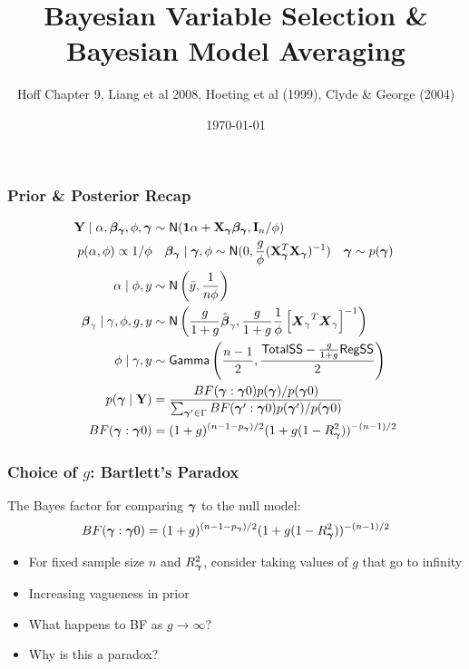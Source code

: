 \documentclass[]{beamer}
\title{Bayesian Variable Selection \&  Bayesian Model Averaging}
\author{Hoff Chapter 9, Liang et al 2008, Hoeting et al (1999), Clyde \&
 George (2004)}
\date{\today}
\begin{document}


\maketitle








\begin{frame}\frametitle{Prior \& Posterior Recap}
\begin{align*}
\mathbf{Y} \mid \alpha, \boldsymbol{\beta_\gamma}, \phi, \boldsymbol{\gamma} & \sim \textsf{N}(\mathbf{1} \alpha + \mathbf{X}_{\boldsymbol{\gamma}} \boldsymbol{\beta_\gamma}, \mathbf{I}_n/ \phi) \\
p(\alpha, \phi) \propto 1/\phi & \quad  \boldsymbol{\beta_\gamma} \mid \boldsymbol{\gamma}, \phi \sim \textsf{N}(0, \frac{g}{\phi} (\mathbf{X}_{\boldsymbol{\gamma}}^T\mathbf{X}_{\boldsymbol{\gamma}})^{-1}) \quad \boldsymbol{\gamma} \sim p(\boldsymbol{\gamma})\\
\alpha \mid \phi, y & \sim \textsf{N}\left(\bar{y}, \frac{1}{n \phi}\right)\\
\boldsymbol{\beta}_{\gamma} \mid \gamma, \phi, g, y &\sim \textsf{N}\left( \frac{g}{1 + g} \hat{\boldsymbol{\beta}}_{\gamma}, \frac{g}{1 + g} \frac{1}{\phi} \left[{\boldsymbol{X}_{\gamma}}^T \boldsymbol{X}_{\gamma} \right]^{-1}  \right) \\
\phi \mid \gamma, y & \sim \textsf{Gamma}\left(\frac{n-1}{2}, \frac{\textsf{TotalSS} - \frac{g}{1+g} \textsf{RegSS}}{2}\right) \\
p(\boldsymbol{\gamma} \mid \mathbf{Y} ) & = \frac{BF(\boldsymbol{\gamma}: \boldsymbol{\gamma}0) p(\boldsymbol{\gamma})/p(\boldsymbol{\gamma}0)} {\sum_{\boldsymbol{\gamma}^\prime \in \Gamma} BF(\boldsymbol{\gamma}^\prime : \boldsymbol{\gamma}0) p(\boldsymbol{\gamma}^\prime)/p(\boldsymbol{\gamma}0)} \\
 BF(\boldsymbol{\gamma} : \boldsymbol{\gamma}0)  & =    (1 + g)^{(n - 1 - p_{\boldsymbol{\gamma}})/2} (1 + g(1 - R_{\boldsymbol{\gamma}}^2))^{-(n-1)/2}
\end{align*}
\end{frame}






\begin{frame} \frametitle{Choice of $g$: Bartlett's Paradox}


The Bayes factor for comparing $\boldsymbol{\gamma}$ to the null
model:
$$
 BF(\boldsymbol{\gamma} : \boldsymbol{\gamma}0) =    (1 + g)^{(n - 1 - p_{\boldsymbol{\gamma}})/2} (1 + g(1 - R_{\boldsymbol{\gamma}}^2))^{-(n-1)/2}
$$
\pause
\begin{itemize}
\item For fixed sample size $n$ and $R_{\boldsymbol{\gamma}}^2$, consider taking values of  $g$ that
  go to infinity  \pause
\item Increasing vagueness in prior \pause
\item What happens to BF as $g \to \infty$? \pause
\item Why is this a paradox?

\end{itemize}
\end{frame}
\end{document}
